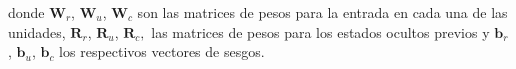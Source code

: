 donde $\textbf{W}_r$, $\textbf{W}_u$, $\textbf{W}_c$ son las matrices de pesos para la entrada en cada una de las unidades, $\textbf{R}_r$, $\textbf{R}_u$, $\textbf{R}_c,$ las matrices de pesos para los estados ocultos previos y $\textbf{b}_r$, $\textbf{b}_u$, $\textbf{b}_c$ los respectivos vectores de sesgos.


\endinput
